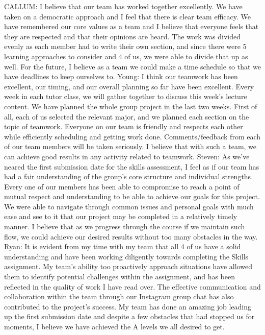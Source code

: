 \documentclass[a4paper, 11pt]{report}
\begin{document}
CALLUM: I believe that our team has worked together excellently. We have taken on a democratic approach and I feel that there is clear team efficacy. We have remembered our core values as a team and I believe that everyone feels that they are respected and that their opinions are heard. The work was divided evenly as each member had to write their own section, and since there were 5 learning approaches to consider and 4 of us, we were able to divide that up as well. For the future, I believe as a team we could make a time schedule so that we have deadlines to keep ourselves to.\newline\newline
Young: I think our teamwork has been excellent,  our timing, and our overall planning so far have been excellent. Every week in each tutor class, we will gather together to discuss this week's lecture content. We have planned the whole group project in the last two weeks. First of all, each of us selected the relevant major, and we planned each section on the topic of teamwork. Everyone on our team is friendly and respects each other while efficiently scheduling and getting work done. Comments/feedback from each of our team members will be taken seriously. I believe that with such a team, we can achieve good results in any activity related to teamwork.\newline\newline
Steven: As we’ve neared the first submission date for the skills assessment, I feel as if our team has had a fair understanding of the group’s core structure and individual strengths. Every one of our members has been able to compromise to reach a point of mutual respect and understanding to be able to achieve our goals for this project. We were able to navigate through common issues and personal goals with much ease and see to it that our project may be completed in a relatively timely manner. I believe that as we progress through the course if we maintain such flow, we could achieve our desired results without too many obstacles in the way.\newline\newline
Ryan:  It is evident from my time with my team that all 4 of us have a solid understanding and have been working diligently towards completing the Skills assignment. My team's ability too proactively approach situations have allowed them to identify potential challenges within the assignment, and has been reflected in the quality of work I have read over. The effective communication and collaboration within the team through our Instagram group chat has also contributed to the project's success. My team has done an amazing job leading up the first submission date and despite a few obstacles that had stopped us for moments, I believe we have achieved the A levels we all desired to get.
\end{document}
